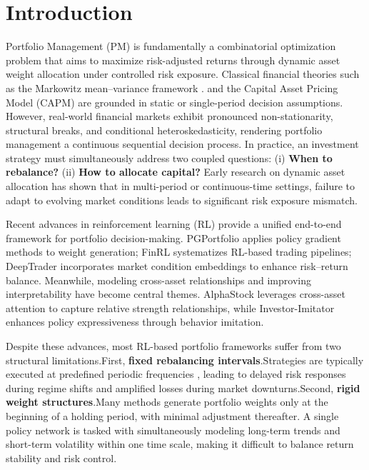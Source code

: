 \documentclass[letterpaper]{article} %
\begin{document}
\section{Introduction}
Portfolio Management (PM) is fundamentally a combinatorial optimization problem that aims to maximize risk-adjusted returns through dynamic asset weight allocation under controlled risk exposure. Classical financial theories such as the Markowitz mean–variance framework  \citep{MVO}. and the Capital Asset Pricing Model (CAPM)  \citep{CAMP} are grounded in static or single-period decision assumptions. However, real-world financial markets exhibit pronounced non-stationarity, structural breaks, and conditional heteroskedasticity, rendering portfolio management a continuous sequential decision process. In practice, an investment strategy must simultaneously address two coupled questions: (i) \textbf{When to rebalance?}  (ii) \textbf{How to allocate capital?} 
Early research on dynamic asset allocation has shown that in multi-period or continuous-time settings, failure to adapt to evolving market conditions leads to significant risk exposure mismatch.\citep{Perold1988DynamicSF}

Recent advances in reinforcement learning (RL) provide a unified end-to-end framework for portfolio decision-making. PGPortfolio \citep{4} applies policy gradient methods to weight generation; FinRL \citep{5} systematizes RL-based trading pipelines; DeepTrader \citep{6} incorporates market condition embeddings to enhance risk–return balance. Meanwhile, modeling cross-asset relationships and improving interpretability have become central themes. AlphaStock \cite{alphastock} leverages cross-asset attention to capture relative strength relationships, while Investor-Imitator \citep{8} enhances policy expressiveness through behavior imitation.

Despite these advances, most RL-based portfolio frameworks suffer from two structural limitations.First, \textbf{fixed rebalancing intervals}.Strategies are typically executed at predefined periodic frequencies \citep{4,5,6}, leading to delayed risk responses during regime shifts and amplified losses during market downturns.Second, \textbf{rigid weight structures}.Many methods generate portfolio weights only at the beginning of a holding period, with minimal adjustment thereafter. A single policy network is tasked with simultaneously modeling long-term trends and short-term volatility within one time scale, making it difficult to balance return stability and risk control.
\end{document}
